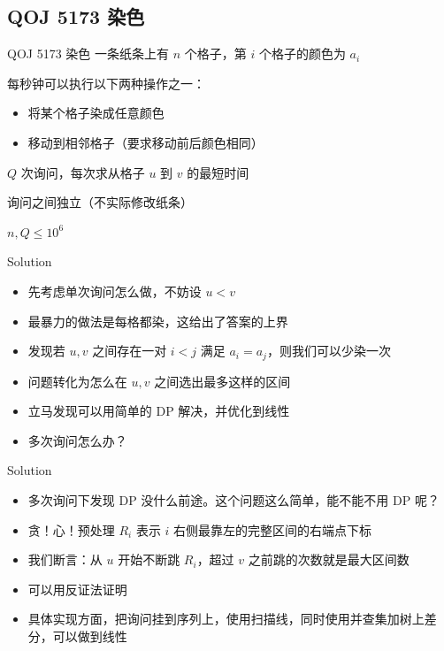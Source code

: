 ﻿\documentclass[aspectratio=169,handout]{ctexbeamer}
\begin{document}
\subsection{QOJ 5173 染色}
\begin{frame}{QOJ 5173 染色}
    一条纸条上有 $n$ 个格子，第 $i$ 个格子的颜色为 $a_i$

每秒钟可以执行以下两种操作之一：

\begin{itemize}
    \item 将某个格子染成任意颜色
    \item 移动到相邻格子（要求移动前后颜色相同）
\end{itemize}

$Q$ 次询问，每次求从格子 $u$ 到 $v$ 的最短时间

询问之间独立（不实际修改纸条）

$n,Q\leq 10^6$
\end{frame}

\begin{frame}{Solution}
    \begin{itemize}
        \item 先考虑单次询问怎么做，不妨设 $u<v$
        \pause
        \item 最暴力的做法是每格都染，这给出了答案的上界
        \pause
        \item 发现若 $u,v$ 之间存在一对 $i<j$ 满足 $a_i=a_j$，则我们可以少染一次
        \item 问题转化为怎么在 $u,v$ 之间选出最多这样的区间
        \pause
        \item 立马发现可以用简单的 DP 解决，并优化到线性
        \item 多次询问怎么办？
    \end{itemize}
\end{frame}


\begin{frame}{Solution}
    \begin{itemize}
        \item 多次询问下发现 DP 没什么前途。这个问题这么简单，能不能不用 DP 呢？
        \pause
        \item 贪！心！预处理 $R_i$ 表示 $i$ 右侧最靠左的完整区间的右端点下标
        \pause
        \item 我们断言：从 $u$ 开始不断跳 $R_i$，超过 $v$ 之前跳的次数就是最大区间数
        \item 可以用反证法证明
        \pause
        \item 具体实现方面，把询问挂到序列上，使用扫描线，同时使用并查集加树上差分，可以做到线性
    \end{itemize}
\end{frame}
\end{document}
